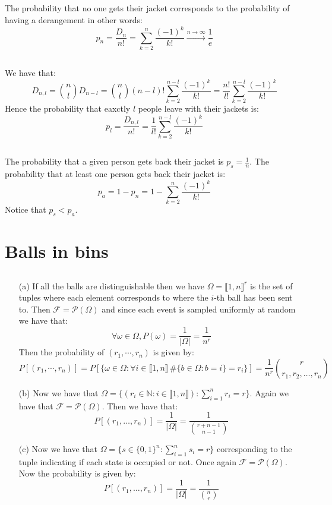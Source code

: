 \documentclass[10pt,a4paper]{book}
\begin{document}
\subsection{}
The probability that no one gets their jacket corresponds to the probability of having a derangement in other words:
\[
p_n = \frac{D_n}{n!} = \sum_{k = 2}^n \frac{(-1)^k}{k!} \stackrel{n\to\infty}{\longrightarrow} \frac{1}{e}
\]

\subsection{}
We have that:
\[
D_{n, l} = \binom{n}{l} D_{n - l} = \binom{n}{l} (n - l)! \sum_{k = 2}^{n - l} \frac{(-1)^k}{k!} = \frac{n!}{l!}\sum_{k = 2}^{n - l} \frac{(-1)^k}{k!}
\]
Hence the probability that eaxctly $l$ people leave with their jackets is:
\[
p_l = \frac{D_{n, l}}{n!} = \frac{1}{l!} \sum_{ k = 2}^{n - l} \frac{(-1)^k}{k!}
\]

\subsection{}
The probability that a given person gets back their jacket is $p_s = \frac{1}{n}$. The probability that at least one person gets back their jacket is:
\[
p_a = 1 - p_n = 1 - \sum_{k = 2}^n \frac{(-1)^k}{k!}
\]
Notice that $p_s < p_a$.

\section{Balls in bins}

\subsection{}
\begin{enumerate}
\item[(a)] If all the balls are distinguishable then we have $\Omega = \llbracket 1 , n \rrbracket^r$ is the set of tuples where each element corresponds to where the $i$-th ball has been sent to. Then $\mathcal{F} = \mathcal{P}(\Omega)$ and since each event is sampled uniformly at random we have that:
\[
\forall \omega \in \Omega, P(\omega) = \frac{1}{|\Omega|} = \frac{1}{n^r}
\] 
Then the probability of $(r_1, \cdots, r_n)$ is given by:
\[
P[(r_1, \cdots, r_n)] = P[\{ \omega \in \Omega : \forall i \in \llbracket 1, n\rrbracket \, \# \{b \in \Omega : b = i\} = r_i \}] = \frac{1}{n^r} \binom{r}{r_1, r_2, \ldots, r_n}
\]
\item[(b)] Now we have that $\Omega = \{ (r_i \in \mathbb{N} : i \in \llbracket 1 , n \rrbracket ) : \sum_{i = 1}^n r_i = r \}$. Again we have that $\mathcal{F} = \mathcal{P}(\Omega)$. Then we have that:
\[
P[(r_1, \ldots, r_n)] = \frac{1}{|\Omega|} = \frac{1}{\binom{r + n - 1}{n - 1}}
\]
\item[(c)] Now we have that $\Omega = \{s \in \{0, 1\}^n : \sum_{i = 1}^n s_i = r \}$ corresponding to the tuple indicating if each state is occupied or not. Once again $\mathcal{F} = \mathcal{P}(\Omega)$. Now the probability is given by:
\[
P[(r_1, \ldots, r_n)] = \frac{1}{|\Omega|} = \frac{1}{\binom{n}{r}}
\]
\end{enumerate}
\end{document}
